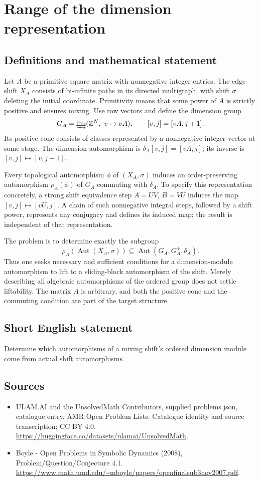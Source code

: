 \documentclass[11pt,a4paper]{article}
\begin{document}
\section*{Range of the dimension representation}\label{statement}

\subsection{Definitions and mathematical statement}
Let $A$ be a primitive square matrix with nonnegative integer entries.
The edge shift $X_A$ consists of bi-infinite paths in its directed
multigraph, with shift $\sigma$ deleting the initial coordinate. Primitivity
means that some power of $A$ is strictly positive and ensures mixing.
Use row vectors and define the dimension group
\[
 G_A=\varinjlim(\mathbb Z^N,\ v\mapsto vA),
 \qquad [v,j]=[vA,j+1].
\]
Its positive cone consists of classes represented by a nonnegative
integer vector at some stage. The dimension automorphism is
$\delta_A[v,j]=[vA,j]$; its inverse is $[v,j]\mapsto[v,j+1]$.

Every topological automorphism $\phi$ of $(X_A,\sigma)$ induces an
order-preserving automorphism $\rho_A(\phi)$ of $G_A$ commuting with
$\delta_A$. To specify this representation concretely, a strong shift
equivalence step $A=UV$, $B=VU$ induces the map
$[v,j]\mapsto[vU,j]$. A chain of such nonnegative integral steps, followed
by a shift power, represents any conjugacy and defines its induced map;
the result is independent of that representation.

The problem is to determine exactly the subgroup
\[
 \rho_A(\operatorname{Aut}(X_A,\sigma))
       \subseteq\operatorname{Aut}(G_A,G_A^+,\delta_A).
\]
Thus one seeks necessary and sufficient conditions for a dimension-module
automorphism to lift to a sliding-block automorphism of the shift.
Merely describing all algebraic automorphisms of the ordered group does
not settle liftability. The matrix $A$ is arbitrary, and both the positive
cone and the commuting condition are part of the target structure.
\subsection{Short English statement}
Determine which automorphisms of a mixing shift’s ordered dimension module come from actual shift automorphisms.
\subsection{Sources}
\begin{itemize}
\item[S1] ULAM.AI and the UnsolvedMath Contributors, supplied problems.json, catalogue entry, AMR Open Problem Lists. Catalogue identity and source transcription; CC BY 4.0.
\url{https://huggingface.co/datasets/ulamai/UnsolvedMath}.
\item[S2] Boyle - Open Problems in Symbolic Dynamics (2008), Problem/Question/Conjecture 4.1. 
\url{https://www.math.umd.edu/~mboyle/papers/openfinalsub3nov2007.pdf}.
\end{itemize}
\end{document}
